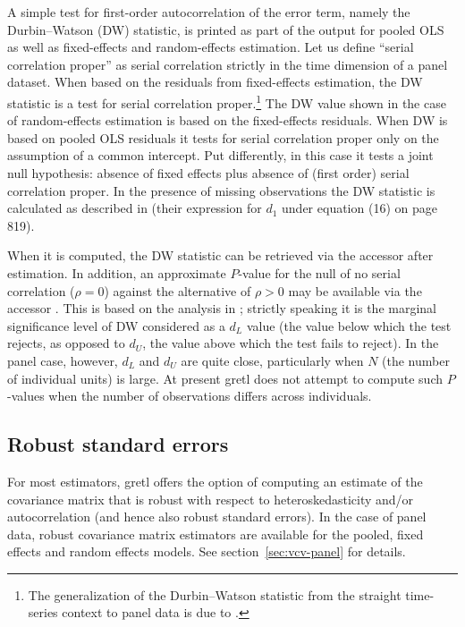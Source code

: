A simple test for first-order autocorrelation of the error term,
namely the Durbin--Watson (DW) statistic, is printed as part of the
output for pooled OLS as well as fixed-effects and random-effects
estimation. Let us define ``serial correlation proper'' as serial
correlation strictly in the time dimension of a panel dataset. When
based on the residuals from fixed-effects estimation, the DW statistic
is a test for serial correlation proper.\footnote{The generalization
  of the Durbin--Watson statistic from the straight time-series
  context to panel data is due to \cite{BFN82}.}  The DW value shown
in the case of random-effects estimation is based on the fixed-effects
residuals. When DW is based on pooled OLS residuals it tests for
serial correlation proper only on the assumption of a common
intercept. Put differently, in this case it tests a joint null
hypothesis: absence of fixed effects plus absence of (first order)
serial correlation proper.  In the presence of missing observations
the DW statistic is calculated as described in \cite{baltagi-Wu99}
(their expression for $d_1$ under equation (16) on page 819).

When it is computed, the DW statistic can be retrieved via the
accessor  after estimation. In addition, an approximate
$P$-value for the null of no serial correlation ($\rho = 0$) against
the alternative of $\rho > 0$ may be available via the accessor
. This is based on the analysis in \cite{BFN82};
strictly speaking it is the marginal significance level of DW
considered as a $d_L$ value (the value below which the test rejects,
as opposed to $d_U$, the value above which the test fails to reject).
In the panel case, however, $d_L$ and $d_U$ are quite close,
particularly when $N$ (the number of individual units) is large. At
present gretl does not attempt to compute such $P$-values when the
number of observations differs across individuals.

\subsection{Robust standard errors}
\label{panel-robust}

For most estimators, gretl offers the option of computing an estimate
of the covariance matrix that is robust with respect to
heteroskedasticity and/or autocorrelation (and hence also robust
standard errors).  In the case of panel data, robust covariance matrix
estimators are available for the pooled, fixed effects and random
effects models.  See section~\ref{sec:vcv-panel} for details.

